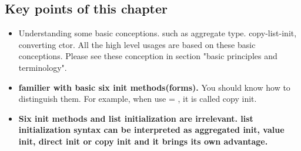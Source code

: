 \documentclass[a4paper,11pt,twoside]{book}
\begin{document}
\subsection{Key points of this chapter}
\begin{itemize}
										  
											  
		
	   
	   
				   
								 
		 
  
	
	\item Understanding some basic conceptions. such as aggregate type. copy-list-init, converting ctor. All the high level usages are based on these basic conceptions. Please see these conception in section "basic principles and terminology".
		  
				
	
	\item \textbf{familier with basic six init methods(forms).} You should know how to distinguish them. For example, when use = , it is called copy init. 
													  
		   
						 
		   
										 
		   
																
		   
																				 
		   
																						   
		   
												
		   
														 
			  
			  
											 
	
	\item \textbf{Six init methods and list initialization are irrelevant. list initialization syntax can be interpreted as aggregated init, value init, direct init or copy init and it brings its own advantage.} 
		   
						 
		   
												  
		   
																				  
		   
									   
		   
																	 
		   
											  
		   
																											  
		   
																			 
		   
																									 
			  
			  
	

\end{itemize}
\end{document}
